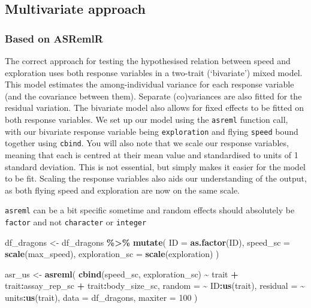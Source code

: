 \documentclass[
  12pt,
]{book}
\newenvironment{Shaded}{\begin{snugshade}}{\end{snugshade}}
\newcommand{\DataTypeTok}[1]{\textcolor[rgb]{0.13,0.29,0.53}{#1}}
\newcommand{\DecValTok}[1]{\textcolor[rgb]{0.00,0.00,0.81}{#1}}
\newcommand{\KeywordTok}[1]{\textcolor[rgb]{0.13,0.29,0.53}{\textbf{#1}}}
\newcommand{\NormalTok}[1]{#1}
\newcommand{\OperatorTok}[1]{\textcolor[rgb]{0.81,0.36,0.00}{\textbf{#1}}}
\newcommand{\StringTok}[1]{\textcolor[rgb]{0.31,0.60,0.02}{#1}}
\begin{document}
\hypertarget{multivariate-approach}{%
\subsection{Multivariate approach}\label{multivariate-approach}}

\hypertarget{based-on-asremlr}{%
\subsubsection{Based on ASRemlR}\label{based-on-asremlr}}

The correct approach for testing the hypothesised relation between speed and exploration uses both response variables in a two-trait (`bivariate') mixed model. This model estimates the among-individual variance for each response variable (and the covariance between them).
Separate (co)variances are also fitted for the residual variation.
The bivariate model also allows for fixed effects to be fitted on both response variables.
We set up our model using the \texttt{asreml} function call, with our bivariate response variable being \texttt{exploration} and flying \texttt{speed} bound together using \texttt{cbind}. You will also note that we scale our response variables, meaning that each is centred at their mean value and standardised to units of 1 standard deviation. This is not essential, but simply makes it easier for the model to be fit. Scaling the response variables also aids our understanding of the output, as both flying speed and exploration are now on the same scale.

\texttt{asreml} can be a bit specific sometime and random effects should absolutely be \texttt{factor} and not \texttt{character} or \texttt{integer}

\begin{Shaded}
\begin{Highlighting}[]
\NormalTok{df\_dragons \textless{}{-}}\StringTok{ }\NormalTok{df\_dragons }\OperatorTok{\%\textgreater{}\%}
\StringTok{  }\KeywordTok{mutate}\NormalTok{(}
    \DataTypeTok{ID =} \KeywordTok{as.factor}\NormalTok{(ID),}
    \DataTypeTok{speed\_sc =} \KeywordTok{scale}\NormalTok{(max\_speed),}
    \DataTypeTok{exploration\_sc =} \KeywordTok{scale}\NormalTok{(exploration)}
\NormalTok{  )}

\NormalTok{asr\_us \textless{}{-}}\StringTok{ }\KeywordTok{asreml}\NormalTok{(}
  \KeywordTok{cbind}\NormalTok{(speed\_sc, exploration\_sc) }\OperatorTok{\textasciitilde{}}\StringTok{ }\NormalTok{trait }\OperatorTok{+}
\StringTok{    }\NormalTok{trait}\OperatorTok{:}\NormalTok{assay\_rep\_sc }\OperatorTok{+}\StringTok{ }\NormalTok{trait}\OperatorTok{:}\NormalTok{body\_size\_sc,}
  \DataTypeTok{random =} \OperatorTok{\textasciitilde{}}\StringTok{ }\NormalTok{ID}\OperatorTok{:}\KeywordTok{us}\NormalTok{(trait),}
  \DataTypeTok{residual =} \OperatorTok{\textasciitilde{}}\StringTok{ }\NormalTok{units}\OperatorTok{:}\KeywordTok{us}\NormalTok{(trait),}
  \DataTypeTok{data =}\NormalTok{ df\_dragons,}
  \DataTypeTok{maxiter =} \DecValTok{100}
\NormalTok{)}
\end{Highlighting}
\end{Shaded}
\end{document}
